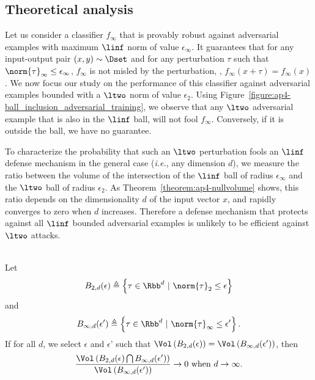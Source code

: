 \subsection{Theoretical analysis}
\label{subsection:ap4-theoretical_analysis}

Let us consider a classifier $f_{\infty}$ that is provably robust against adversarial examples with maximum $\linf$ norm of value $\epsilon_\infty$.
It guarantees that for any input-output pair $(x,y) \sim \Dset$ and for any perturbation $\tau$ such that $\norm{\tau}_\infty \leq \epsilon_\infty$, $f_{\infty}$ is not misled by the perturbation, \ie, $f_{\infty}(x + \tau) = f_{\infty}(x)$.
We now focus our study on the performance of this classifier against adversarial examples bounded with a $\ltwo$ norm of value $\epsilon_2$.
Using Figure~\ref{figure:ap4-ball_inclusion_adversarial_training}, we observe that any $\ltwo$ adversarial example that is also in the $\linf$ ball, will not fool $f_{\infty}$.
Conversely, if it is outside the ball, we have no guarantee.

To characterize the probability that such an  $\ltwo$ perturbation fools an $\linf$ defense mechanism in the general case (\emph{i.e.}, any dimension $d$), we measure the ratio between the volume of the intersection of the $\linf$ ball of radius $\epsilon_\infty$ and the $\ltwo$ ball of radius $\epsilon_2$. As Theorem~\ref{theorem:ap4-nullvolume} shows, this ratio depends on the dimensionality $d$ of the input vector $x$, and  rapidly converges to zero when $d$ increases. 
Therefore a defense mechanism that protects against all $\linf$ bounded adversarial examples is unlikely to be efficient against $\ltwo$ attacks.


\begin{theorem} ~\\
Let
\begin{equation}
  B_{2,d}(\epsilon) \triangleq \left \{\tau \in \Rbb^d \ |\  \norm{\tau}_2 \leq \epsilon \right \}
\end{equation}
and
\begin{equation}
  B_{\infty,d}(\epsilon') \triangleq \left \{\tau \in \Rbb^d \ |\  \norm{\tau}_\infty \leq \epsilon' \right\}.
\end{equation}
If for all $d$, we select $\epsilon$ and $\epsilon$' such that $\Vol\left(B_{2,d}(\epsilon)\right) = \Vol\left(B_{\infty,d}(\epsilon')\right)$, then
\begin{equation}
  \frac{\Vol\left(B_{2,d}(\epsilon)\bigcap B_{\infty,d}(\epsilon')\right)}{\Vol\left(B_{\infty,d}(\epsilon')\right)} \rightarrow 0 \text{ when } d\rightarrow \infty.
\end{equation}
\label{theorem:ap4-nullvolume}
\end{theorem} 

